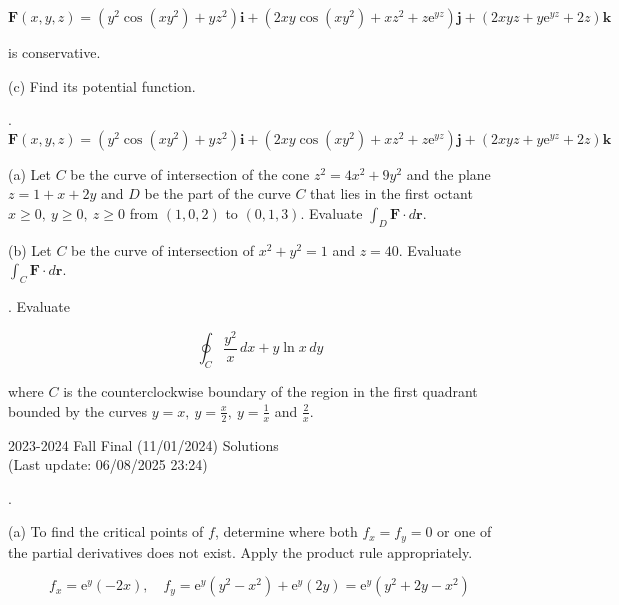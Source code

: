 \documentclass{article}
\begin{document}
\[\mathbf{F}(x,y,z)=\left(y^2\cos\left(xy^2\right)+yz^2\right)\mathbf{i}+\left(2xy\cos\left(xy^2\right)+xz^2+z\mathrm{e}^{yz}\right)\mathbf{j}+\left(2xyz+y\mathrm{e}^{yz}+2z\right)\mathbf{k}\]

\hfill

\noindent is conservative.

\hfill

\noindent (c) Find its potential function.

\newpage

. $\mathbf{F}(x,y,z)=\left(y^2\cos\left(xy^2\right)+yz^2\right)\mathbf{i}+\left(2xy\cos\left(xy^2\right)+xz^2+z\mathrm{e}^{yz}\right)\mathbf{j}+\left(2xyz+y\mathrm{e}^{yz}+2z\right)\mathbf{k}$

\hfill

\noindent (a) Let $C $ be the curve of intersection of the cone $z^2=4x^2+9y^2$ and the plane $z=1+x+2y$ and $D$ be the part of the curve $C$ that lies in the first octant $x\geq0,\:y\geq0,\:z\geq0$ from $(1,0,2)$ to $(0,1,3)$. Evaluate $\int_D\mathbf{F}\cdot d\mathbf{r}$.

\hfill

\noindent (b) Let $C$ be the curve of intersection of $x^2+y^2=1$ and $z=40$. Evaluate $\int_C\mathbf{F}\cdot d\mathbf{r}$.

\hfill

. Evaluate

\[\oint_C\frac{y^2}x\,dx+y\ln x\,dy\]

\hfill

\noindent where $C$ is the counterclockwise boundary of the region in the first quadrant bounded by the curves $\displaystyle y=x,\:y=\frac x2,\:y=\frac1x$ and $\displaystyle\frac2x$.

\newpage

\begin{center}
2023-2024 Fall Final (11/01/2024) Solutions\\
(Last update: 06/08/2025 23:24)
\end{center}

.

\hfill

\noindent (a) To find the critical points of $f$, determine where both $f_x=f_y=0$ or one of the partial derivatives does not exist. Apply the product rule appropriately.

\[f_x=\mathrm{e}^y(-2x),\quad f_y=\mathrm{e}^y\left(y^2-x^2\right)+\mathrm{e}^y(2y)=\mathrm{e}^y\left(y^2+2y-x^2\right)\]
\end{document}
